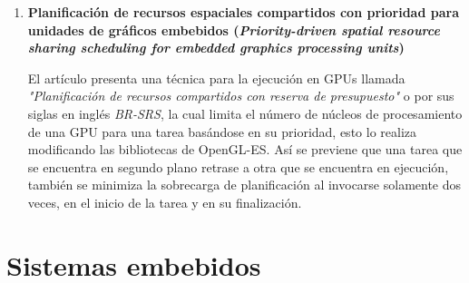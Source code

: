 \begin{enumerate}
\item \textbf{Planificación de recursos espaciales compartidos con prioridad para unidades de gráficos embebidos 
	 (\textit{Priority-driven spatial resource sharing scheduling for embedded graphics processing units})}

El artículo \cite{Pridriven} presenta una técnica para la ejecución en GPUs llamada \textit{"Planificación de recursos compartidos con reserva de presupuesto"} o por sus siglas en inglés \textit{BR-SRS}, la cual limita el número de núcleos de procesamiento de una GPU para una tarea basándose en su prioridad, esto lo realiza modificando las bibliotecas de OpenGL-ES. Así se previene que una tarea que se encuentra en segundo plano retrase a otra que se encuentra en ejecución, también se minimiza la sobrecarga de planificación al invocarse solamente dos veces, en el inicio de la tarea y en su finalización.

\end{enumerate}  

\section{Sistemas embebidos}


